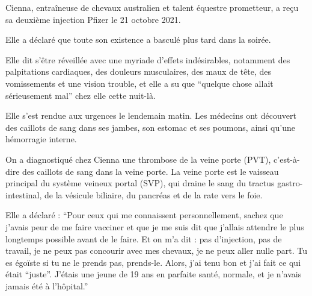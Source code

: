 Cienna, entraîneuse de chevaux australien et talent équestre prometteur, a reçu
sa deuxième injection Pfizer le 21 octobre 2021.

Elle a déclaré que toute son existence a basculé plus tard dans la soirée.

Elle dit s'être réveillée avec une myriade d'effets indésirables, notamment des
palpitations cardiaques, des douleurs musculaires, des maux de tête, des
vomissements et une vision trouble, et elle a su que “quelque chose allait
sérieusement mal” chez elle cette nuit-là.

Elle s'est rendue aux urgences le lendemain matin. Les médecins ont découvert
des caillots de sang dans ses jambes, son estomac et ses poumons, ainsi qu'une
hémorragie interne.

On a diagnostiqué chez Cienna une thrombose de la veine porte (PVT),
c'est-à-dire des caillots de sang dans la veine porte. La veine porte est le
vaisseau principal du système veineux portal (SVP), qui draine le sang du
tractus gastro-intestinal, de la vésicule biliaire, du pancréas et de la rate
vers le foie.

Elle a déclaré : “Pour ceux qui me connaissent personnellement, sachez que
j'avais peur de me faire vacciner et que je me suis dit que j'allais attendre le
plus longtemps possible avant de le faire. Et on m'a dit : pas d'injection, pas
de travail, je ne peux pas concourir avec mes chevaux, je ne peux aller nulle
part. Tu es égoïste si tu ne le prends pas, prends-le. Alors, j'ai tenu bon et
j'ai fait ce qui était “juste”. J'étais une jeune de 19 ans en parfaite santé,
normale, et je n'avais jamais été à l'hôpital.”
